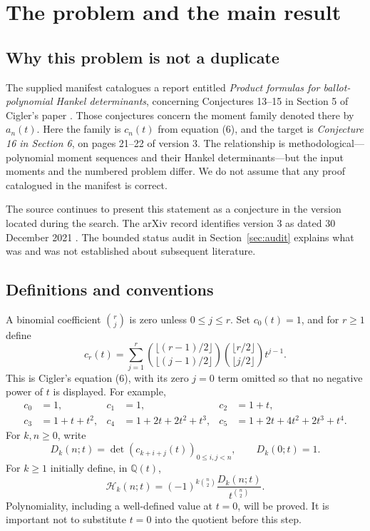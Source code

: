 \documentclass[11pt]{article}
\theoremstyle{definition}
\theoremstyle{remark}
\newcommand{\Q}{\mathbb Q}
\newcommand{\Ht}{\mathcal H}
\theoremstyle{definition}
\theoremstyle{plain}
\numberwithin{equation}{section}
\begin{document}
\clearpage
\tableofcontents
\clearpage

\section{The problem and the main result}
\label{sec:main}

\subsection{Why this problem is not a duplicate}
The supplied manifest \cite{manifest} catalogues a report entitled
\emph{Product formulas for ballot-polynomial Hankel determinants}, concerning
Conjectures 13--15 in Section 5 of Cigler's paper \cite{Cigler}.
Those conjectures concern the moment family denoted there by $a_n(t)$.
Here the family is $c_n(t)$ from equation (6), and the target is
\emph{Conjecture 16 in Section 6}, on pages 21--22 of version 3.
The relationship is methodological---polynomial moment sequences and their
Hankel determinants---but the input moments and the numbered problem differ.
We do not assume that any proof catalogued in the manifest is correct.

The source continues to present this statement as a conjecture in the
version located during the search. The arXiv record identifies version 3
as dated 30 December 2021 \cite{Cigler}. The bounded status audit in
Section~\ref{sec:audit} explains what was and was not established about
subsequent literature.

\subsection{Definitions and conventions}
A binomial coefficient $\binom rj$ is zero unless $0\le j\le r$.
Set $c_0(t)=1$, and for $r\ge1$ define
\begin{equation}
 c_r(t)=\sum_{j=1}^{r}
 \binom{\lfloor(r-1)/2\rfloor}{\lfloor(j-1)/2\rfloor}
 \binom{\lfloor r/2\rfloor}{\lfloor j/2\rfloor}t^{j-1}.
 \label{eq:source-moments}
\end{equation}
This is Cigler's equation (6), with its zero $j=0$ term omitted so that no
negative power of $t$ is displayed. For example,
\begin{align*}
 c_0&=1,&c_1&=1,&c_2&=1+t,\\
 c_3&=1+t+t^2,&
 c_4&=1+2t+2t^2+t^3,&
 c_5&=1+2t+4t^2+2t^3+t^4.
\end{align*}
For $k,n\ge0$, write
\begin{equation}
 D_k(n;t)=\det(c_{k+i+j}(t))_{0\le i,j<n},\qquad D_k(0;t)=1.
 \label{eq:D}
\end{equation}
For $k\ge1$ initially define, in $\Q(t)$,
\begin{equation}
 \Ht_k(n;t)=(-1)^{k\binom n2}\frac{D_k(n;t)}{t^{\binom n2}}.
 \label{eq:normalization}
\end{equation}
Polynomiality, including a well-defined value at $t=0$, will be proved.
It is important not to substitute $t=0$ into the quotient before this step.
\end{document}
